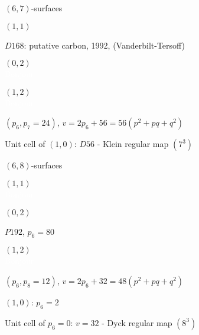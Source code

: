 \documentclass[%
pdf,
colorBG,
slideColor,
]{prosper}
\begin{document}
\begin{slide}{$(6,7)$-surfaces}
\begin{center}
\begin{minipage}[b]{3.7cm}
\centering
{}\par
$(1,1)$\par
$D168$: putative carbon, 1992, (Vanderbilt-Tersoff)
\end{minipage}
\begin{minipage}[b]{3.7cm}
\centering
{}\par
$(0,2)$\\
\textcolor{white}{Bonjour}
\end{minipage}
\begin{minipage}[b]{3.7cm}
\centering
{}\par
$(1,2)$\\
\textcolor{white}{Bonjour}
\end{minipage}
\end{center}

\begin{center}
$(p_6, p_7=24)$, $v=2p_6+56=56(p^2+pq+q^2)$\par
Unit cell of $(1,0)$: $D56$ - Klein regular map $(7^3)$

\end{center}
\end{slide}




\begin{slide}{$(6,8)$-surfaces}
\begin{center}
\begin{minipage}[b]{3.7cm}
\centering
{}\par
$(1,1)$\\
\textcolor{white}{Bonjour}
\end{minipage}
\begin{minipage}[b]{3.7cm}
\centering
{}\par
$(0,2)$\par
$P192$, $p_6=80$
\end{minipage}
\begin{minipage}[b]{3.7cm}
\centering
{}\par
$(1,2)$\\
\textcolor{white}{Bonjour}
\end{minipage}
\end{center}

\begin{center}
$(p_6, p_8=12)$, $v=2p_6+32=48(p^2+pq+q^2)$\par
$(1,0)$: $p_6=2$ \par
Unit cell of $p_6=0$: $v=32$ - Dyck regular map $(8^3)$
\end{center}
\end{slide}
\end{document}
